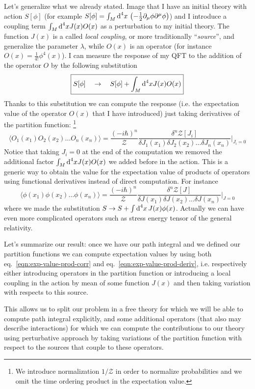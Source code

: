 \documentclass[../main/main.tex]{subfiles}
\begin{document}
Let's generalize what we already stated. Image that I have an initial theory with action $S[\phi]$ (for example $S[\phi]=\int_M\textup{d}^4x\,\left(-\frac12\partial_\mu\phi\partial^\mu\phi\right)$) and I introduce a coupling term $\int_M\textup{d}^4xJ(x)O(x)$ as a perturbation to my initial theory. The function $J(x)$ is a called \emph{local coupling}, or more traditionally ``\emph{source}'', and generalize the parameter $\lambda$, while $O(x)$ is an operator (for instance $O(x)=\frac1{4!}\phi^4(x)$). I can measure the response of my QFT to the addition of the operator $O$ by the following substitution
\begin{equation}\boxed{
S[\phi]\quad\to\quad S[\phi]+\int_M\textup{d}^4xJ(x)O(x)
}\end{equation}
Thanks to this substitution we can compute the response (i.e. the expectation value of the operator $O(x)$ that I have introduced) just taking derivatives of the partition function: \footnote{We introduce normalization $1/\mathcal Z$ in order to normalize probabilities and we omit the time ordering product in the expectation value.}
\begin{equation}\label{eqn:exp-value-prod-deriv}\boxed{
\langle O_1(x_1)O_2(x_2)\dots O_n(x_n)\rangle=\frac{(-i\hbar)^n}{\mathcal Z}\frac{\delta^n\mathcal Z[J_i]}{\delta J_1(x_1)\delta J_2(x_2)\dots \delta J_n(x_n)}\bigg\vert_{J_i=0}
}\end{equation}
Notice that taking $J_i=0$ at the end of the computation we removed the additional factor $\int_M\textup{d}^4xJ(x)O(x)$ we added before in the action. 
This is a generic way to obtain the value for the expectation value of products of operators using functional derivatives instead of direct computation. For instance
\[\langle\phi(x_1)\phi(x_2)\dots\phi(x_n)\rangle=\frac{(-i\hbar)^n}{\mathcal Z}\frac{\delta^n\mathcal Z[J]}{\delta J(x_1)\delta J(x_2)\dots \delta J(x_n)}\bigg\vert_{J=0}\]
where we made the substitution
$S\to S+\int\textup{d}^4x \,J(x)\phi(x)$.
Actually we can have even more complicated operators such as stress energy tensor of the general relativity. 

Let's summarize our result: once we have our path integral and we defined our partition functions we can compute expectation values by using both eq.~\eqref{eqn:exp-value-prod-corr} and eq.~\eqref{eqn:exp-value-prod-deriv}, i.e. respectively either introducing operators in the partition function or introducing a local coupling in the action by mean of some function $J(x)$ and then taking variation with respects to this source.  

This allows us to split our problem in a free theory for which we will be able to compute path integral explicitly, and some additional operators (that also may describe interactions) for which we can compute the contributions to our theory using perturbative approach by taking variations of the partition function with respect to the sources that couple to these operators. 
\end{document}
